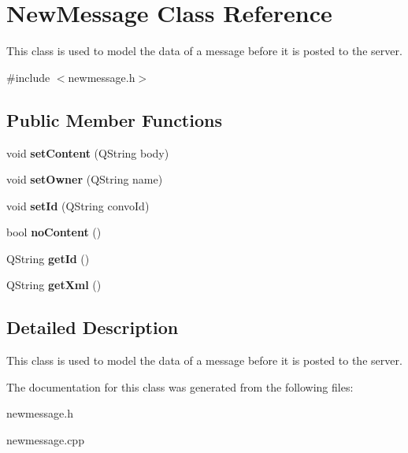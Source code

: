 \hypertarget{classNewMessage}{\section{New\-Message Class Reference}
\label{classNewMessage}
}


This class is used to model the data of a message before it is posted to the server.  




{\ttfamily \#include $<$newmessage.\-h$>$}

\subsection*{Public Member Functions}
\begin{DoxyCompactItemize}
\item 
\hypertarget{classNewMessage_a773fd0b0f79708c8f368e615711c696c}{void {\bfseries set\-Content} (Q\-String body)}\label{classNewMessage_a773fd0b0f79708c8f368e615711c696c}

\item 
\hypertarget{classNewMessage_a9660f536eacf3c6c2a04bc5ba883f8fa}{void {\bfseries set\-Owner} (Q\-String name)}\label{classNewMessage_a9660f536eacf3c6c2a04bc5ba883f8fa}

\item 
\hypertarget{classNewMessage_a002f8a0357c09a9eb15430067f7659db}{void {\bfseries set\-Id} (Q\-String convo\-Id)}\label{classNewMessage_a002f8a0357c09a9eb15430067f7659db}

\item 
\hypertarget{classNewMessage_a0edf97e2ee024c47d9866caf69b7a34c}{bool {\bfseries no\-Content} ()}\label{classNewMessage_a0edf97e2ee024c47d9866caf69b7a34c}

\item 
\hypertarget{classNewMessage_afa830d24d03c861d393a73f1f99630b5}{Q\-String {\bfseries get\-Id} ()}\label{classNewMessage_afa830d24d03c861d393a73f1f99630b5}

\item 
\hypertarget{classNewMessage_aac3e3e9b815f44b18ef59f377a944279}{Q\-String {\bfseries get\-Xml} ()}\label{classNewMessage_aac3e3e9b815f44b18ef59f377a944279}

\end{DoxyCompactItemize}


\subsection{Detailed Description}
This class is used to model the data of a message before it is posted to the server. 

The documentation for this class was generated from the following files\-:\begin{DoxyCompactItemize}
\item 
newmessage.\-h\item 
newmessage.\-cpp\end{DoxyCompactItemize}
